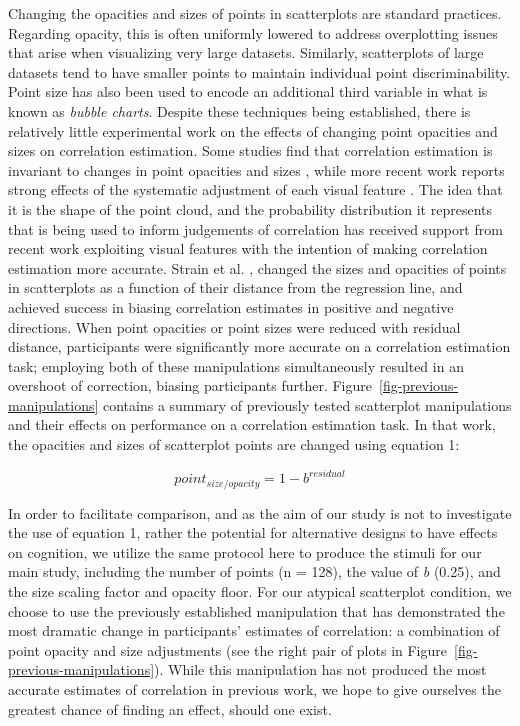\documentclass[manuscript,screen,review]{acmart}
\begin{document}
Changing the opacities and sizes of points in scatterplots are standard
practices. Regarding opacity, this is often uniformly lowered to address
overplotting \citep{matejka_2015} issues that arise when visualizing
very large datasets. Similarly, scatterplots of large datasets tend to
have smaller points to maintain individual point discriminability. Point
size has also been used to encode an additional third variable in what
is known as \emph{bubble charts}. Despite these techniques being
established, there is relatively little experimental work on the effects
of changing point opacities and sizes on correlation estimation. Some
studies find that correlation estimation is invariant to changes in
point opacities and sizes \citep{rensink_2014, rensink_2017}, while more
recent work reports strong effects of the systematic adjustment of each
visual feature \citep{strain_2023, strain_2023b, strain_2024}. The idea
that it is the shape of the point cloud, and the probability
distribution it represents that is being used to inform judgements of
correlation has received support from recent work exploiting visual
features with the intention of making correlation estimation more
accurate. Strain et al. \citep{strain_2023, strain_2023b, strain_2024},
changed the sizes and opacities of points in scatterplots as a function
of their distance from the regression line, and achieved success in
biasing correlation estimates in positive and negative directions. When
point opacities \citep{strain_2023} or point sizes \citep{strain_2023b}
were reduced with residual distance, participants were significantly
more accurate on a correlation estimation task; employing both of these
manipulations simultaneously \citep{strain_2024} resulted in an
overshoot of correction, biasing participants further.
Figure~\ref{fig-previous-manipulations} contains a summary of previously
tested scatterplot manipulations and their effects on performance on a
correlation estimation task. In that work, the opacities and sizes of
scatterplot points are changed using equation 1:

\begin{equation}
  point_{size/opacity} = 1 - b^{residual}
\end{equation}

In order to facilitate comparison, and as the aim of our study is not to
investigate the use of equation 1, rather the potential for alternative
designs to have effects on cognition, we utilize the same protocol here
to produce the stimuli for our main study, including the number of
points (n = 128), the value of \emph{b} (0.25), and the size scaling
factor and opacity floor. For our atypical scatterplot condition, we
choose to use the previously established manipulation that has
demonstrated the most dramatic change in participants' estimates of
correlation: a combination of point opacity and size adjustments
\citep{strain_2024} (see the right pair of plots in
Figure~\ref{fig-previous-manipulations}). While this manipulation has
not produced the most accurate estimates of correlation in previous
work, we hope to give ourselves the greatest chance of finding an
effect, should one exist.
\end{document}
